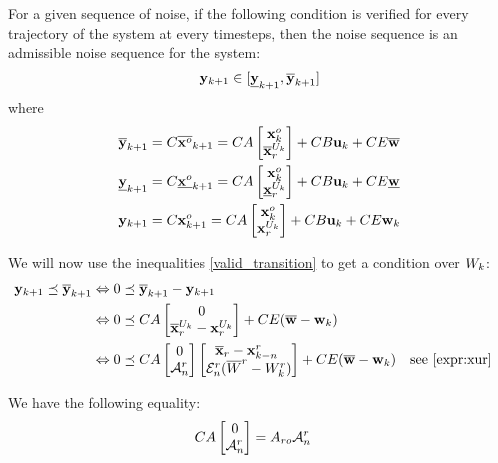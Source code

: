 \newcommand{\ANoise}{\Omega}
\newcommand{\NoiseSet}{\mathcal{W}}
\newcommand{\infseq}{\omega}

\newcommand{\sykn}{\msup{\y}_{k+1}}%
\newcommand{\iykn}{\minf{\y}_{k+1}}%
For a given sequence of noise, if the following condition is verified for every trajectory of the system at every timesteps, then the noise sequence is an admissible noise sequence for the system:
\begin{equation} \label{valid_transition}
\ykn \in [\iykn,\sykn]
\end{equation}
where 
\begin{align*}
\sykn &= C \msup{\xo}_{k+1} = 
C A 
\begin{bmatrix}
\xo_{k} \\
\xuks
\end{bmatrix}
+ C B \uk + C E \msup{\w}
\\
\iykn &= C \minf{\xo}_{k+1} 
= C A 
\begin{bmatrix}
\xo_{k} \\
\xuki
\end{bmatrix}
+ C B \uk + C E \minf{\w}
\\
\ykn &= C \xo_{k+1}
= C A 
\begin{bmatrix}
\xo_{k} \\
\xuk
\end{bmatrix}
+ C B \uk + C E \wk
\end{align*}

We will now use the inequalities \ref{valid_transition} to get a condition over $W_k$:
\begin{align*}
\ykn \mleq \sykn
& \Leftrightarrow
0 \mleq \sykn - \ykn \\
& \Leftrightarrow
0 \mleq
C A \begin{bmatrix} 0 \\ \xuks-\xuk \end{bmatrix}
+ C E (\msup{\w} -\wk)
\\
& \Leftrightarrow
0 \mleq
C A 
\begin{bmatrix} 0 \\ \An \end{bmatrix} 
\begin{bmatrix}
\xrsup - \xr_{k-n}\ \\
\En (\Wrsup - \Wrk)
\end{bmatrix}
+ C E (\msup{\w} -\wk)
&& \textrm{see \ref{expr:xur}}
\end{align*}

We have the following equality:
\begin{align*}
C A \begin{bmatrix} 0 \\ \mathcal{A}^r_n \end{bmatrix} 
& = A_{ro} \mathcal{A}^r_n
\end{align*}

